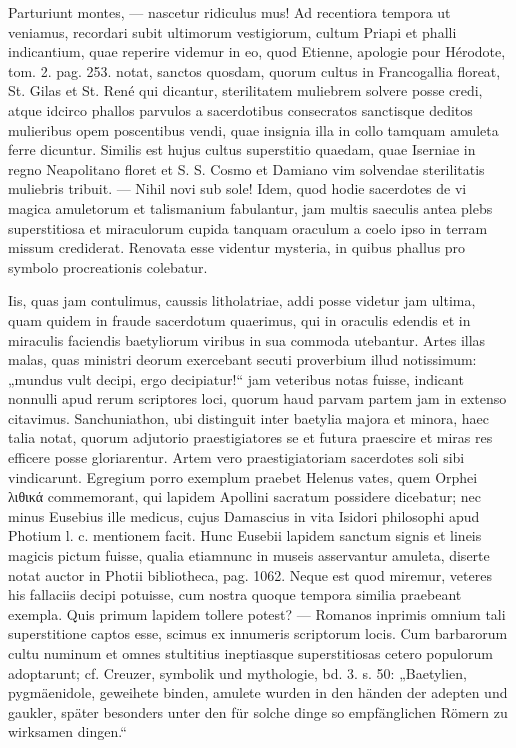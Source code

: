 \documentclass[a4paper, 11pt, oneside, polutonikogreek, german]{article}
\begin{document}
Parturiunt montes, --- nascetur ridiculus mus! Ad recentiora tempora ut veniamus, recordari subit ultimorum vestigiorum, cultum Priapi et phalli indicantium, quae reperire videmur in eo, quod Etienne, apologie pour Hérodote, tom. 2. pag. 253. notat, sanctos quosdam, quorum cultus in Francogallia floreat, St. Gilas et St. René qui dicantur, sterilitatem muliebrem solvere posse credi, atque idcirco phallos parvulos a sacerdotibus consecratos sanctisque deditos mulieribus opem poscentibus vendi, quae insignia illa in collo tamquam amuleta ferre dicuntur. Similis est hujus cultus superstitio quaedam, quae Iserniae in regno Neapolitano floret et S. S. Cosmo et Damiano vim solvendae sterilitatis muliebris tribuit. --- Nihil novi sub sole! Idem, quod hodie sacerdotes de vi magica amuletorum et talismanium fabulantur, jam multis saeculis antea plebs superstitiosa et miraculorum cupida tanquam oraculum a coelo ipso in terram missum crediderat. Renovata esse videntur mysteria, in quibus phallus pro symbolo procreationis colebatur.

Iis, quas jam contulimus, caussis litholatriae, addi posse videtur jam ultima, quam quidem in fraude sacerdotum quaerimus, qui in oraculis edendis et in miraculis faciendis baetyliorum viribus in sua commoda utebantur. Artes illas malas, quas ministri deorum exercebant secuti proverbium illud notissimum: „mundus vult decipi, ergo decipiatur!“ jam veteribus notas fuisse, indicant nonnulli apud rerum scriptores loci, quorum haud parvam partem jam in extenso citavimus. Sanchuniathon, ubi distinguit inter baetylia majora et minora, haec talia notat, quorum adjutorio praestigiatores se et futura praescire et miras res efficere posse gloriarentur. Artem vero praestigiatoriam sacerdotes soli sibi vindicarunt. Egregium porro exemplum praebet Helenus vates, quem Orphei λιθικά commemorant, qui lapidem Apollini sacratum possidere dicebatur; nec minus Eusebius ille medicus, cujus Damascius in vita Isidori philosophi apud Photium l. c. mentionem facit. Hunc Eusebii lapidem sanctum signis et lineis magicis pictum fuisse, qualia etiamnunc in museis asservantur amuleta, diserte notat auctor in Photii bibliotheca, pag. 1062. Neque est quod miremur, veteres his fallaciis decipi potuisse, cum nostra quoque tempora similia praebeant exempla. Quis primum lapidem tollere potest? --- Romanos inprimis omnium tali superstitione captos esse, scimus ex innumeris scriptorum locis. Cum barbarorum cultu numinum et omnes stultitius ineptiasque superstitiosas cetero populorum adoptarunt; cf. Creuzer, symbolik und mythologie, bd. 3. s. 50: „Baetylien, pygmäenidole, geweihete binden, amulete wurden in den händen der adepten und gaukler, später besonders unter den für solche dinge so empfänglichen Römern zu wirksamen dingen.“
\end{document}
